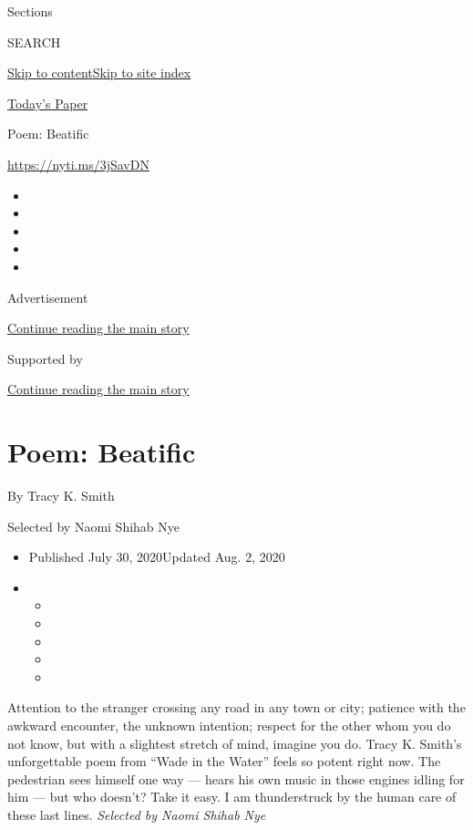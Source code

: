 Sections

SEARCH

\protect\hyperlink{site-content}{Skip to
content}\protect\hyperlink{site-index}{Skip to site index}

\href{https://myaccount.nytimes3xbfgragh.onion/auth/login?response_type=cookie\&client_id=vi}{}

\href{https://www.nytimes3xbfgragh.onion/section/todayspaper}{Today's
Paper}

Poem: Beatific

\url{https://nyti.ms/3jSavDN}

\begin{itemize}
\item
\item
\item
\item
\item
\end{itemize}

Advertisement

\protect\hyperlink{after-top}{Continue reading the main story}

Supported by

\protect\hyperlink{after-sponsor}{Continue reading the main story}

\hypertarget{poem-beatific}{%
\section{Poem: Beatific}\label{poem-beatific}}

By Tracy K. Smith

Selected by Naomi Shihab Nye

\begin{itemize}
\item
  Published July 30, 2020Updated Aug. 2, 2020
\item
  \begin{itemize}
  \item
  \item
  \item
  \item
  \item
  \end{itemize}
\end{itemize}

Attention to the stranger crossing any road in any town or city;
patience with the awkward encounter, the unknown intention; respect for
the other whom you do not know, but with a slightest stretch of mind,
imagine you do. Tracy K. Smith's unforgettable poem from ``Wade in the
Water'' feels so potent right now. The pedestrian sees himself one way
--- hears his own music in those engines idling for him --- but who
doesn't? Take it easy. I am thunderstruck by the human care of these
last lines. \emph{Selected by Naomi Shihab Nye}

